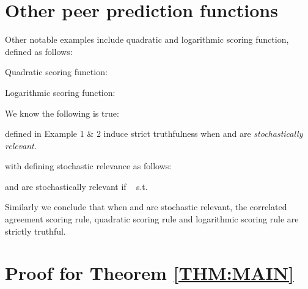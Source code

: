 \section*{Other peer prediction functions}

 Other notable examples include quadratic and logarithmic scoring function, defined as follows:
\begin{example}
Quadratic scoring function:

\end{example}

\begin{example}
Logarithmic scoring function: 

\end{example}
We know the following is true:
\begin{lemma}
 defined in Example 1 \& 2 induce strict truthfulness when  and  are \emph{stochastically relevant}.
\end{lemma}
with defining stochastic relevance as follows:
\begin{definition}
 and  are stochastically relevant if
 ~ s.t. 

\end{definition}


Similarly we conclude that when  and  are stochastic relevant, the correlated agreement scoring rule, quadratic scoring rule and logarithmic scoring rule are strictly truthful. 






\section*{Proof for Theorem \ref{THM:MAIN}}

